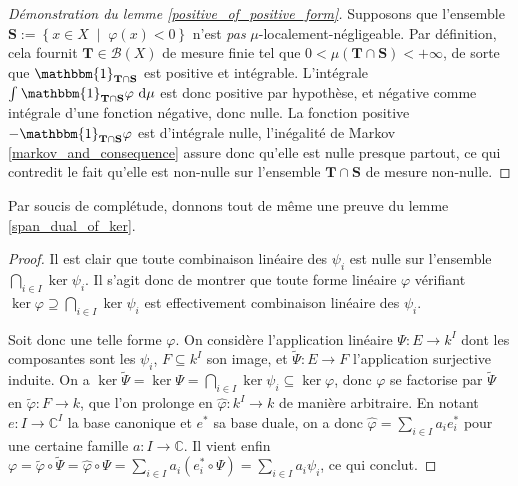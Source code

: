 \documentclass[a4paper,12pt]{article}
\newcommand{\C}{\mathbb{C}}
\newcommand{\Bor}{\mathcal{B}}
\newcommand{\set}[1]{\left\{ #1 \right\}}
\newcommand{\indic}{\mathbbm{1}}
\newcommand{\integral}[4]{\int_{#1}^{#2} #3~\mathrm{d}#4}
\newcommand{\tq}{\;\middle|\;}
\newcommand{\comp}{\circ}
\begin{document}
\begin{proof}[Démonstration du lemme \ref{positive_of_positive_form}]
    Supposons que l'ensemble $\mathbf{S} := \set{x\in X\tq\varphi(x)<0}$ n'est \emph{pas} $\mu$-localement-négligeable. Par définition, cela fournit 
    $\mathbf{T}\in\Bor(X)$ de mesure finie tel que $0<\mu(\mathbf{T}\cap\mathbf{S})<+\infty$, de sorte que $\indic_{\mathbf{T}\cap\mathbf{S}}$ est positive et intégrable. L'intégrale
    $\integral{}{}{\indic_{\mathbf{T}\cap\mathbf{S}}\varphi}{\mu}$ est donc positive par hypothèse, et négative comme intégrale d'une fonction négative,
    donc nulle. La fonction positive $-\indic_{\mathbf{T}\cap\mathbf{S}}\varphi$ est d'intégrale nulle, 
    l'inégalité de Markov \ref{markov_and_consequence} assure donc qu'elle est nulle presque partout, ce qui contredit le fait qu'elle est non-nulle 
    sur l'ensemble $\mathbf{T}\cap\mathbf{S}$ de mesure non-nulle.
\end{proof}

Par soucis de complétude, donnons tout de même une preuve du lemme \ref{span_dual_of_ker}.

\begin{proof}
    Il est clair que toute combinaison linéaire des $\psi_i$ est nulle sur l'ensemble $\bigcap_{i\in I}\ker\psi_i$.
    Il s'agit donc de montrer que toute forme linéaire $\varphi$ vérifiant $\ker\varphi\supseteq\bigcap_{i\in I}\ker\psi_i$ est effectivement 
    combinaison linéaire des $\psi_i$. 
    
    Soit donc une telle forme $\varphi$. On considère l'application linéaire $\Psi : E\to k^I$ 
    dont les composantes sont les $\psi_i$, $F\subseteq k^I$ son image, et $\widetilde{\Psi}:E\to F$ l'application surjective induite.
    On a $\ker\widetilde{\Psi} = \ker\Psi = \bigcap_{i\in I}\ker\psi_i \subseteq \ker \varphi$, donc $\varphi$ se factorise 
    par $\widetilde{\Psi}$ en $\widetilde{\varphi}:F\to k$, que l'on prolonge en $\widehat{\varphi}:k^I\to k$ de manière arbitraire.
    En notant $e : I\to\C^I$ la base canonique et $e^*$ sa base duale, on a donc $\widehat{\varphi} = \sum_{i\in I} a_i e^*_i$
    pour une certaine famille $a : I\to\C$. Il vient enfin
    $\varphi = \widetilde{\varphi}\comp\widetilde{\Psi} = \widehat{\varphi}\comp\Psi = \sum_{i\in I} a_i (e^*_i \comp\Psi) = \sum_{i\in I} a_i\psi_i$,
    ce qui conclut.
\end{proof}
\end{document}
